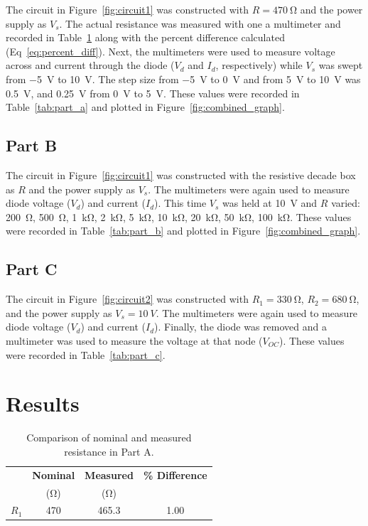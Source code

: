 \documentclass{article}
\begin{document}
The circuit in Figure~\ref{fig:circuit1} was constructed with $R =
\SI{470}{\ohm}$ and the power supply as $V_s$.  The actual resistance
was measured with one a multimeter and recorded in
Table~\ref{tab:percent_diff} along with the percent difference calculated
(Eq~\ref{eq:percent_diff}).  Next, the multimeters were used to
measure voltage across and current through the diode ($V_d$ and $I_d$,
respectively) while $V_s$ was swept from \SI{-5}{V} to \SI{+10}{V}.
The step size from \SI{-5}{V} to \SI{0}{V} and from \SI{5}{V} to
\SI{10}{V} was \SI{0.5}{V}, and \SI{0.25}{V} from \SI{0}{V} to
\SI{5}{V}.  These values were recorded in Table~\ref{tab:part_a} and
plotted in Figure~\ref{fig:combined_graph}.

\subsection{Part B}
\label{sec:proc_b}

The circuit in Figure~\ref{fig:circuit1} was constructed with the
resistive decade box as $R$ and the power supply as $V_s$.  The
multimeters were again used to measure diode voltage ($V_d$) and
current ($I_d$).  This time $V_s$ was held at \SI{10}{V} and $R$
varied: \SI{200}{\ohm}, \SI{500}{\ohm}, \SI{1}{\kilo\ohm},
\SI{2}{\kilo\ohm}, \SI{5}{\kilo\ohm}, \SI{10}{\kilo\ohm},
\SI{20}{\kilo\ohm}, \SI{50}{\kilo\ohm}, \SI{100}{\kilo\ohm}.  These
values were recorded in Table~\ref{tab:part_b} and plotted in
Figure~\ref{fig:combined_graph}.

\subsection{Part C}
\label{sec:proc_c}

The circuit in Figure~\ref{fig:circuit2} was constructed with $R_1 =
\SI{330}{\ohm}$, $R_2 = \SI{680}{\ohm}$, and the power supply as $V_s
= \SI{10}{V}$.  The multimeters were again used to measure diode
voltage ($V_d$) and current ($I_d$).  Finally, the diode was removed
and a multimeter was used to measure the voltage at that node
($V_{OC}$).  These values were recorded in Table~\ref{tab:part_c}.

\section{Results}
\label{sec:results}

\begin{table}[hbtp]
  \centering
  \begin{tabular}{*{4}{c}}
    & \textbf{Nominal} & \textbf{Measured} & \textbf{\% Difference} \\
    & (\si{\ohm}) & (\si{\ohm}) & \\
    \hline
    $R_1$ & 470 & 465.3 & 1.00 \\
  \end{tabular}
  \caption{\label{tab:percent_diff} Comparison of nominal and measured resistance in Part A.}
\end{table}
\end{document}

